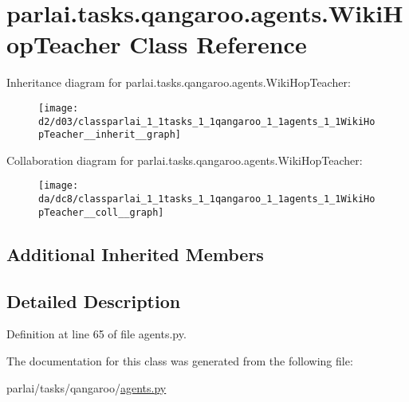 \hypertarget{classparlai_1_1tasks_1_1qangaroo_1_1agents_1_1WikiHopTeacher}{}\section{parlai.\+tasks.\+qangaroo.\+agents.\+Wiki\+Hop\+Teacher Class Reference}
\label{classparlai_1_1tasks_1_1qangaroo_1_1agents_1_1WikiHopTeacher}


Inheritance diagram for parlai.\+tasks.\+qangaroo.\+agents.\+Wiki\+Hop\+Teacher\+:\nopagebreak
\begin{figure}[H]
\begin{center}
\leavevmode
\texttt{[image: d2/d03/classparlai\_1\_1tasks\_1\_1qangaroo\_1\_1agents\_1\_1WikiHopTeacher\_\_inherit\_\_graph]}
\end{center}
\end{figure}


Collaboration diagram for parlai.\+tasks.\+qangaroo.\+agents.\+Wiki\+Hop\+Teacher\+:\nopagebreak
\begin{figure}[H]
\begin{center}
\leavevmode
\texttt{[image: da/dc8/classparlai\_1\_1tasks\_1\_1qangaroo\_1\_1agents\_1\_1WikiHopTeacher\_\_coll\_\_graph]}
\end{center}
\end{figure}
\subsection*{Additional Inherited Members}


\subsection{Detailed Description}


Definition at line 65 of file agents.\+py.



The documentation for this class was generated from the following file\+:\begin{DoxyCompactItemize}
\item 
parlai/tasks/qangaroo/\hyperlink{parlai_2tasks_2qangaroo_2agents_8py}{agents.\+py}\end{DoxyCompactItemize}
